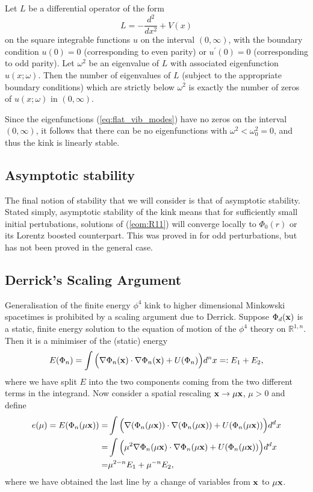 \begin{theo}[Sturm]\label{th:sturm} Let $L$ be a differential operator of the form
\[
L=-\frac{d^2}{dx^2}+V(x)
\]
on the square integrable functions $u$ on the interval $(0,\infty)$, with the boundary condition $u(0)=0$ (corresponding to even parity) or $u^\prime(0)=0$ (corresponding to odd parity). Let $\omega^2$ be an eigenvalue of $L$ with associated eigenfunction $u(x;\omega)$. Then the number of eigenvalues of $L$ (subject to the appropriate boundary conditions) which are strictly below $\omega^2$ is exactly the number of zeros of $u(x;\omega)$ in $(0,\infty)$.
\end{theo}

Since the eigenfunctions (\ref{eq:flat_vib_modes}) have no zeros on the interval $(0,\infty)$, it follows that there can be no eigenfunctions with $\omega^2<\omega_0^2=0$, and thus the kink is linearly stable.

\subsection{Asymptotic stability}
The final notion of stability that we will consider is that of asymptotic stability. Stated simply, asymptotic stability of the kink means that for sufficiently small initial pertubations, solutions of (\ref{eom:R11}) will converge locally to $\Phi_0(r)$ or its Lorentz boosted counterpart. This was proved in \cite{KowalczykMM} for odd perturbations, but has not been proved in the general case.

\subsection{Derrick's Scaling Argument}
Generalisation of the finite energy $\phi^4$ kink to higher dimensional Minkowski spacetimes is prohibited by a scaling argument due to Derrick. Suppose $\Phi_d({\bf x})$ is a static, finite energy solution to the equation of motion of the $\phi^4$ theory on $\mathbb{R}^{1,n}$. Then it is a minimiser of the (static) energy
\[
E(\Phi_n)=\int\Big(\nabla\Phi_n({\bf x})\cdot\nabla\Phi_n({\bf x}) + U(\Phi_n)\Big)d^nx=:E_1+E_2,
\]
where we have split $E$ into the two components coming from the two different terms in the integrand. Now consider a spatial rescaling ${\bf x}\rightarrow\mu{\bf x}$, $\mu>0$ and define 
\begin{align*}
e(\mu)= E(\Phi_n(\mu{\bf x}))=&\int\Big(\nabla(\Phi_n(\mu {\bf x}))\cdot\nabla(\Phi_n(\mu {\bf x})) + U(\Phi_n(\mu {\bf x}))\Big)d^dx \\
=& \int\Big(\mu^2\nabla\Phi_n(\mu {\bf x})\cdot\nabla\Phi_n(\mu {\bf x}) + U(\Phi_n(\mu {\bf x}))\Big)d^dx \\
=& \mu^{2-n}E_1 + \mu^{-n}E_2,
\end{align*}
where we have obtained the last line by a change of variables from ${\bf x}$ to $\mu{\bf x}$.

